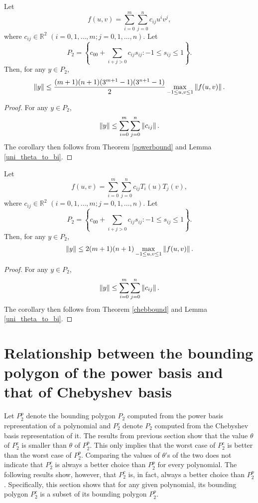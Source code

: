 \documentclass[12pt]{article}
\begin{document}
\begin{cor}
Let
\[
f(u,v) = \sum_{i=0}^m \sum_{j=0}^n c_{ij}u^i v^j,
\]
where $c_{ij} \in \mathbb{R}^2$ $(i=0,1,\ldots,m; j=0,1,\ldots,n)$.
Let
\[
P_2 = \left\{ c_{00} + \sum_{i+j > 0} c_{ij} s_{ij} : -1
\leq s_{ij} \leq 1 \right\}.
\]
Then, for any $y \in P_2$,
\[
\left\|y\right\| \leq  \frac{(m+1)(n+1)(3^{m+1}-1)(3^{n+1}-1)}{2}\max_{-1 \leq u,v \leq 1}\left\|f(u,v)\right\|.
\]
\end{cor}
\begin{proof}
For any $y \in P_2$,
\[
\left\|y\right\| \leq \sum_{i=0}^m \sum_{j=0}^n \left\|c_{ij}\right\|.
\]
The corollary then follows from Theorem \ref{powerbound} and Lemma \ref{uni_theta_to_bi}.
\end{proof}

\begin{cor}
Let
\[
f(u,v) = \sum_{i=0}^m \sum_{j=0}^n c_{ij}T_i(u)T_j(v),
\]
where $c_{ij} \in \mathbb{R}^2$ $(i=0,1,\ldots,m; j=0,1,\ldots,n)$.
Let
\[
P_2 = \left\{ c_{00} + \sum_{i+j > 0} c_{ij} s_{ij} : -1
\leq s_{ij} \leq 1 \right\}.
\]
Then, for any $y \in P_2$,
\[
\left\|y\right\| \leq  2(m+1)(n+1)\max_{-1 \leq u,v \leq 1}\left\|f(u,v)\right\|.
\]
\end{cor}
\begin{proof}
For any $y \in P_2$,
\[
\left\|y\right\| \leq \sum_{i=0}^m \sum_{j=0}^n \left\|c_{ij}\right\|.
\]
The corollary then follows from Theorem \ref{chebbound} and Lemma \ref{uni_theta_to_bi}.
\end{proof}

\section{Relationship between the bounding polygon of the power basis and that of Chebyshev basis}
\label{section_cheb_better_than_power} Let $P_2^p$ denote the
bounding polygon $P_2$ computed from the power basis
representation of a polynomial and $P_2^c$ denote $P_2$ computed
from the Chebyshev basis representation of it. The results from
previous section show that the value $\theta$ of $P_2^c$ is
smaller than $\theta$ of $P_2^p$. This only implies that the worst
case of $P_2^c$ is better than the worst case of $P_2^p$.
Comparing the values of $\theta$'s of the two does not indicate
that $P_2^c$ is always a better choice than $P_2^p$ for every
polynomial.  The following results show, however, that $P_2^c$ is,
in fact, always a better choice than $P_2^p$. Specifically, this
section shows that for any given polynomial, its bounding polygon
$P_2^c$ is a subset of its bounding polygon $P_2^p$.
\end{document}
